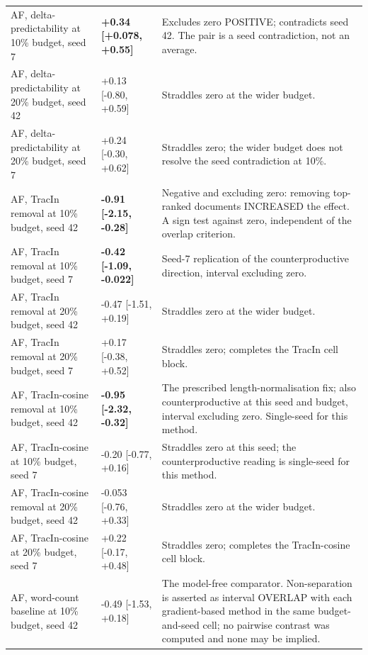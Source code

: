\documentclass[10pt]{article}
\begin{document}
{\begin{longtable}{ p{3.52cm}lp{8.16cm} }
AF, delta-predictability at 10\% budget, seed 7 & \textbf{ +0.34 [+0.078, +0.55] } & Excludes zero POSITIVE; contradicts seed 42. The pair is a seed contradiction, not an average. \\

AF, delta-predictability at 20\% budget, seed 42 & +0.13 [-0.80, +0.59] & Straddles zero at the wider budget. \\

AF, delta-predictability at 20\% budget, seed 7 & +0.24 [-0.30, +0.62] & Straddles zero; the wider budget does not resolve the seed contradiction at 10\%. \\

AF, TracIn removal at 10\% budget, seed 42 & \textbf{ -0.91 [-2.15, -0.28] } & Negative and excluding zero: removing top-ranked documents INCREASED the effect. A sign test against zero, independent of the overlap criterion. \\

AF, TracIn removal at 10\% budget, seed 7 & \textbf{ -0.42 [-1.09, -0.022] } & Seed-7 replication of the counterproductive direction, interval excluding zero. \\

AF, TracIn removal at 20\% budget, seed 42 & -0.47 [-1.51, +0.19] & Straddles zero at the wider budget. \\

AF, TracIn removal at 20\% budget, seed 7 & +0.17 [-0.38, +0.52] & Straddles zero; completes the TracIn cell block. \\

AF, TracIn-cosine removal at 10\% budget, seed 42 & \textbf{ -0.95 [-2.32, -0.32] } & The prescribed length-normalisation fix; also counterproductive at this seed and budget, interval excluding zero. Single-seed for this method. \\

AF, TracIn-cosine at 10\% budget, seed 7 & -0.20 [-0.77, +0.16] & Straddles zero at this seed; the counterproductive reading is single-seed for this method. \\

AF, TracIn-cosine removal at 20\% budget, seed 42 & -0.053 [-0.76, +0.33] & Straddles zero at the wider budget. \\

AF, TracIn-cosine at 20\% budget, seed 7 & +0.22 [-0.17, +0.48] & Straddles zero; completes the TracIn-cosine cell block. \\

AF, word-count baseline at 10\% budget, seed 42 & -0.49 [-1.53, +0.18] & The model-free comparator. Non-separation is asserted as interval OVERLAP with each gradient-based method in the same budget-and-seed cell; no pairwise contrast was computed and none may be implied. \\


\end{longtable}}
\end{document}
